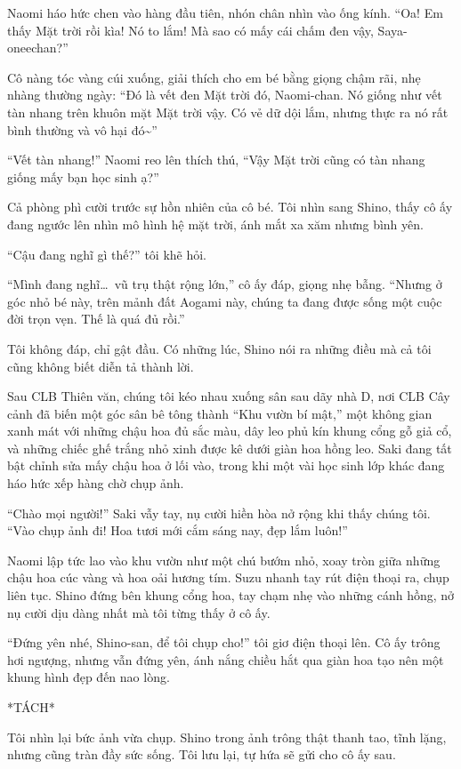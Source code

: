 \documentclass[../main.tex]{subfiles}
\begin{document}
Naomi háo hức chen vào hàng đầu tiên, nhón chân nhìn vào ống kính. ``Oa! Em thấy Mặt trời rồi kìa! Nó to lắm! Mà sao có mấy cái chấm đen vậy, Saya-oneechan?''

Cô nàng tóc vàng cúi xuống, giải thích cho em bé bằng giọng chậm rãi, nhẹ nhàng thường ngày: ``Đó là vết đen Mặt trời đó, Naomi-chan. Nó giống như vết tàn nhang trên khuôn mặt Mặt trời vậy. Có vẻ dữ dội lắm, nhưng thực ra nó rất bình thường và vô hại đó\~{}''

``Vết tàn nhang!'' Naomi reo lên thích thú, ``Vậy Mặt trời cũng có tàn nhang giống mấy bạn học sinh ạ?''

Cả phòng phì cười trước sự hồn nhiên của cô bé. Tôi nhìn sang Shino, thấy cô ấy đang ngước lên nhìn mô hình hệ mặt trời, ánh mắt xa xăm nhưng bình yên.

``Cậu đang nghĩ gì thế?'' tôi khẽ hỏi.

``Mình đang nghĩ\dots\ vũ trụ thật rộng lớn,'' cô ấy đáp, giọng nhẹ bẫng. ``Nhưng ở góc nhỏ bé này, trên mảnh đất Aogami này, chúng ta đang được sống một cuộc đời trọn vẹn. Thế là quá đủ rồi.''

Tôi không đáp, chỉ gật đầu. Có những lúc, Shino nói ra những điều mà cả tôi cũng không biết diễn tả thành lời.

Sau CLB Thiên văn, chúng tôi kéo nhau xuống sân sau dãy nhà D, nơi CLB Cây cảnh đã biến một góc sân bê tông thành ``Khu vườn bí mật,'' một không gian xanh mát với những chậu hoa đủ sắc màu, dây leo phủ kín khung cổng gỗ giả cổ, và những chiếc ghế trắng nhỏ xinh được kê dưới giàn hoa hồng leo. Saki đang tất bật chỉnh sửa mấy chậu hoa ở lối vào, trong khi một vài học sinh lớp khác đang háo hức xếp hàng chờ chụp ảnh.

``Chào mọi người!'' Saki vẫy tay, nụ cười hiền hòa nở rộng khi thấy chúng tôi. ``Vào chụp ảnh đi! Hoa tươi mới cắm sáng nay, đẹp lắm luôn!''

Naomi lập tức lao vào khu vườn như một chú bướm nhỏ, xoay tròn giữa những chậu hoa cúc vàng và hoa oải hương tím. Suzu nhanh tay rút điện thoại ra, chụp liên tục. Shino đứng bên khung cổng hoa, tay chạm nhẹ vào những cánh hồng, nở nụ cười dịu dàng nhất mà tôi từng thấy ở cô ấy.

``Đứng yên nhé, Shino-san, để tôi chụp cho!'' tôi giơ điện thoại lên. Cô ấy trông hơi ngượng, nhưng vẫn đứng yên, ánh nắng chiều hắt qua giàn hoa tạo nên một khung hình đẹp đến nao lòng.

*TÁCH*

Tôi nhìn lại bức ảnh vừa chụp. Shino trong ảnh trông thật thanh tao, tĩnh lặng, nhưng cũng tràn đầy sức sống. Tôi lưu lại, tự hứa sẽ gửi cho cô ấy sau.
\end{document}
